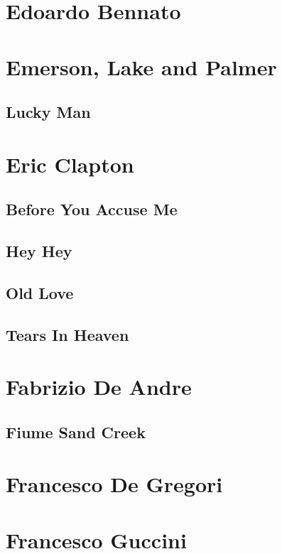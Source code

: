 \chapter{Edoardo Bennato}

\chapter{Emerson, Lake and Palmer}
\section{Lucky Man}

\chapter{Eric Clapton}
\section{Before You Accuse Me}
\section{Hey Hey}
\section{Old Love}
\section{Tears In Heaven}

\chapter{Fabrizio De Andre}
\section{Fiume Sand Creek}

\chapter{Francesco De Gregori}

\chapter{Francesco Guccini}
